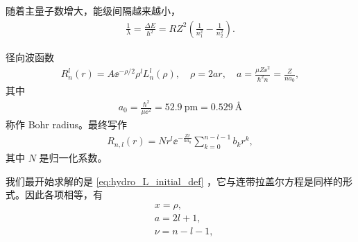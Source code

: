 随着主量子数增大，能级间隔越来越小，
\begin{align}
    \frac1\lambda = \frac{\Delta E}{\hbar^2} = R Z^2 \left(
        \frac1{n_1^2} - \frac1{n_2^2}
    \right). 
\end{align}

径向波函数
\begin{align}
    R_n^l (r) = A \ee^{- \rho/2} \rho^l L_n^l(\rho), \quad \rho = 2ar,
    \quad a = \frac{\mu Z \ee^2}{\hbar^2 n} = \frac Z{na_0},
\end{align}
其中
\begin{align}
    a_0 = \frac{\hbar^2}{\mu \ee^2} = \SI{52.9}{\pico\metre} = \SI{0.529}{\angstrom}
\end{align}
称作 Bohr radius。最终写作
\begin{align}
    R_{n,l}(r) = N r^l \ee^{- \frac{Zr}{na_0}} \sum_{k=0}^{n-l-1} b_k r^k,
\end{align}
其中 $N$ 是归一化系数。

我们最开始求解的是 \eqref{eq:hydro_L_initial_def}
，它与连带拉盖尔方程是同样的形式。因此各项相等，有
\begin{align}
    & x = \rho, \\
    & a = 2l+1,\\
    &\nu = n-l-1,
\end{align}

